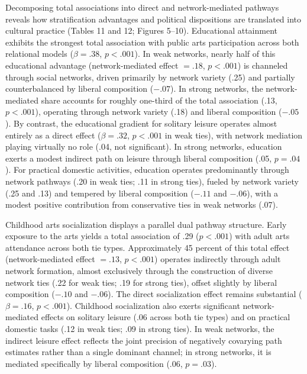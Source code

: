 \documentclass[
  12pt
]{article}
\begin{document}
Decomposing total associations into direct and network-mediated pathways reveals how stratification advantages and political dispositions are translated into cultural practice (Tables 11 and 12; Figures 5--10). Educational attainment exhibits the strongest total association with public arts participation across both relational models ($\beta = .38$, $p < .001$). In weak networks, nearly half of this educational advantage (network-mediated effect $= .18$, $p < .001$) is channeled through social networks, driven primarily by network variety (.25) and partially counterbalanced by liberal composition ($-.07$). In strong networks, the network-mediated share accounts for roughly one-third of the total association (.13, $p < .001$), operating through network variety (.18) and liberal composition ($-.05$). By contrast, the educational gradient for solitary leisure operates almost entirely as a direct effect ($\beta = .32$, $p < .001$ in weak ties), with network mediation playing virtually no role (.04, not significant). In strong networks, education exerts a modest indirect path on leisure through liberal composition (.05, $p = .04$). For practical domestic activities, education operates predominantly through network pathways (.20 in weak ties; .11 in strong ties), fueled by network variety (.25 and .13) and tempered by liberal composition ($-.11$ and $-.06$), with a modest positive contribution from conservative ties in weak networks (.07).

Childhood arts socialization displays a parallel dual pathway structure. Early exposure to the arts yields a total association of .29 ($p < .001$) with adult arts attendance across both tie types. Approximately 45 percent of this total effect (network-mediated effect $= .13$, $p < .001$) operates indirectly through adult network formation, almost exclusively through the construction of diverse network ties (.22 for weak ties; .19 for strong ties), offset slightly by liberal composition ($-.10$ and $-.06$). The direct socialization effect remains substantial ($\beta = .16$, $p < .001$). Childhood socialization also exerts significant network-mediated effects on solitary leisure (.06 across both tie types) and on practical domestic tasks (.12 in weak ties; .09 in strong ties). In weak networks, the indirect leisure effect reflects the joint precision of negatively covarying path estimates rather than a single dominant channel; in strong networks, it is mediated specifically by liberal composition (.06, $p = .03$).
\end{document}

